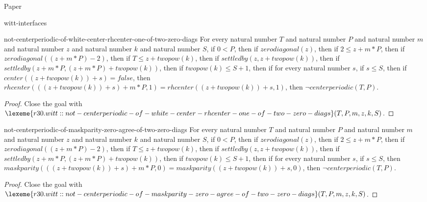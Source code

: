 \begin{lexlean}{Paper}
\begin{section}{witt-interfaces}
  \begin{theorem}{not-centerperiodic-of-white-center-rhcenter-one-of-two-zero-diags}
  For every natural number \(T\) and natural number \(P\) and natural number \(m\) and natural number \(z\) and natural number \(k\) and natural number \(S\), if \(0 < P\), then if \(zerodiagonal(z)\), then if \(2 ≤ z + m * P\), then if \(zerodiagonal((z + m * P) - 2)\), then if \(T ≤ z + twopow(k)\), then if \(settledby(z, z + twopow(k))\), then if \(settledby(z + m * P, (z + m * P) + twopow(k))\), then if \(twopow(k) ≤ S + 1\), then if for every natural number \(s\), if \(s ≤ S\), then if \(center((z + twopow(k)) + s) = false\), then \(rhcenter(((z + twopow(k)) + s) + m * P, 1) = rhcenter((z + twopow(k)) + s, 1)\), then \(¬ centerperiodic(T, P)\).
  \begin{proof}
  Close the goal with \(\lexeme{r30.witt::not-centerperiodic-of-white-center-rhcenter-one-of-two-zero-diags}(T, P, m, z, k, S)\).
  \end{proof}
  \end{theorem}

  \begin{theorem}{not-centerperiodic-of-maskparity-zero-agree-of-two-zero-diags}
  For every natural number \(T\) and natural number \(P\) and natural number \(m\) and natural number \(z\) and natural number \(k\) and natural number \(S\), if \(0 < P\), then if \(zerodiagonal(z)\), then if \(2 ≤ z + m * P\), then if \(zerodiagonal((z + m * P) - 2)\), then if \(T ≤ z + twopow(k)\), then if \(settledby(z, z + twopow(k))\), then if \(settledby(z + m * P, (z + m * P) + twopow(k))\), then if \(twopow(k) ≤ S + 1\), then if for every natural number \(s\), if \(s ≤ S\), then \(maskparity(((z + twopow(k)) + s) + m * P, 0) = maskparity((z + twopow(k)) + s, 0)\), then \(¬ centerperiodic(T, P)\).
  \begin{proof}
  Close the goal with \(\lexeme{r30.witt::not-centerperiodic-of-maskparity-zero-agree-of-two-zero-diags}(T, P, m, z, k, S)\).
  \end{proof}
  \end{theorem}


\end{section}
\end{lexlean}
